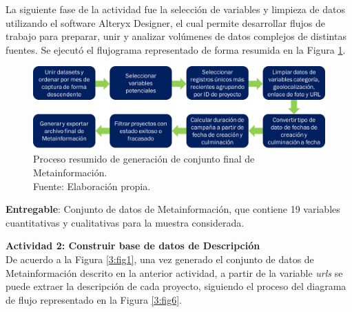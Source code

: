 La siguiente fase de la actividad fue la selección de variables y limpieza de datos utilizando el software Alteryx Designer, el cual permite desarrollar flujos de trabajo para preparar, unir y analizar volúmenes de datos complejos de distintas fuentes. Se ejecutó el flujograma representado de forma resumida en la Figura \ref{3:fig5}.

\begin{figure}[h]
	\begin{center}
		\includegraphics[width=1\textwidth,clip]{3/figures/flujograma_metadata_t3.png}
		\caption[Proceso resumido de generación de conjunto final de Metainformación]{Proceso resumido de generación de conjunto final de Metainformación.\\
			Fuente: Elaboración propia.}
		\label{3:fig5}
	\end{center}
\end{figure}

\textbf{Entregable}: Conjunto de datos de Metainformación, que contiene 19 variables cuantitativas y cualitativas para la muestra considerada.

\textbf{Actividad 2: Construir base de datos de Descripción}
\\
De acuerdo a la Figura \ref{3:fig1}, una vez generado el conjunto de datos de Metainformación descrito en la anterior actividad, a partir de la variable \textit{urls} se puede extraer la descripción de cada proyecto, siguiendo el proceso del diagrama de flujo representado en la Figura \ref{3:fig6}.

